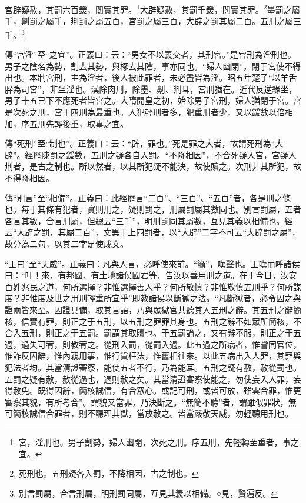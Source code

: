 宮辟疑赦，其罰六百鍰，閱實其罪。\footnote{宮，淫刑也。男子割勢，婦人幽閉，次死之刑。序五刑，先輕轉至重者，事之宜。}大辟疑赦，其罰千鍰，閱實其罪。\footnote{死刑也。五刑疑各入罰，不降相因，古之制也。}墨罰之屬千，劓罰之屬千，剕罰之屬五百，宮罰之屬三百，大辟之罰其屬二百。五刑之屬三千。\footnote{別言罰屬，合言刑屬，明刑罰同屬，互見其義以相備。○見，賢遍反。}

{\noindent\zhuan{}\fzbyks 傳“宮淫”至“之宜”。正義曰：云：“男女不以義交者，其刑宮。”是宮刑為淫刑也。男子之陰名為勢，割去其勢，與椓去其陰，事亦同也。“婦人幽閉”，閉于宮使不得出也。本制宮刑，主為淫者，後人被此罪者，未必盡皆為淫。昭五年楚子“以羊舌肸為司宮”，非坐淫也。漢除肉刑，除墨、劓、剕耳，宮刑猶在。近代反逆緣坐，男子十五已下不應死者皆宮之。大隋開皇之初，始除男子宮刑，婦人猶閉于宮。宮是次死之刑，宮于四刑為最重也。人犯輕刑者多，犯重刑者少，又以鍰數以倍相加，序五刑先輕後重，取事之宜。 \par}

{\noindent\zhuan{}\fzbyks 傳“死刑”至“制也”。正義曰：云：“辟，罪也。”死是罪之大者，故謂死刑為“大辟”。經歷陳罰之鍰數，五刑之疑各自入罰。“不降相因”，不合死疑入宮，宮疑入剕者，是古之制也。所以然者，以其所犯疑不能決，故使贖之。次刑非其所犯，故不得降相因。 \par}

{\noindent\zhuan{}\fzbyks 傳“別言”至“相備”。正義曰：此經歷言“二百”、“三百”、“五百”者，各是刑之條也。每于其條有犯者，實則刑之，疑則罰之，刑屬罰屬其數同也。別言罰屬，五者各言其數，合言刑屬，但總云“三千”，明刑罰同其屬數，互見其義以相備也。經云“大辟之罰，其屬二百”，文異于上四罰者，以“大辟”二字不可云“大辟罰之屬”，故分為二句，以其二字足使成文。 \par}

{\noindent\shu{}\fzkt “王曰”至“天威”。正義曰：凡與人言，必呼使來前。“籲”，嘆聲也。王嘆而呼諸侯曰：“吁！來，有邦國、有土地諸侯國君等，告汝以善用刑之道。在于今日，汝安百姓兆民之道，何所選擇？非惟選擇善人乎？何所敬慎？非惟敬慎五刑乎？何所謀度？非惟度及世之用刑輕重所宜乎”即教諸侯以斷獄之法。“凡斷獄者，必令囚之與證兩皆來至。囚證具備，取其言語，乃與眾獄官共聽其入五刑之辭。其五刑之辭簡核，信實有罪，則正之于五刑，以五刑之罪罪其身也。五刑之辭不如眾所簡核，不合入五刑，則正之于五罰。罰謂其取贖也。于五罰論之，又有辭不服，則正之于五過，過失可宥，則教宥之。從刑入罰，從罰入過。此五過之所病者，惟嘗同官位，惟詐反囚辭，惟內親用事，惟行貨枉法，惟舊相往來。以此五病出入人罪，其罪與犯法者均。其當清證審察，能使五者不行，乃為能耳。五刑之疑有赦，赦從罰也。五罰之疑有赦，赦從過也，過則赦之矣。其當清證審察使能之，勿使妄入人罪，妄得赦免。既得囚辭，簡核誠信，有合眾心。或記可刑，或皆可放，雖雲合罪，惟更審察其貌，有所考合”。謂貌又當罪，乃決斷之。“無簡不聽”者，謂雖似罪狀，無可簡核誠信合罪者，則不聽理其獄，當放赦之。皆當嚴敬天威，勿輕聽用刑也。 \par}

